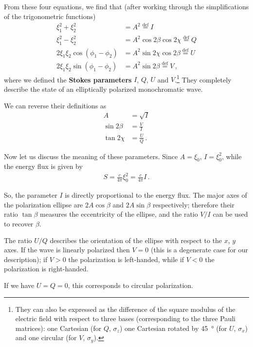 \documentclass[main.tex]{subfiles}
\begin{document}
From these four equations, we find that (after working through the simplifications of the trigonometric functions)
%
\begin{align}
\xi_1^2 + \xi_2^2 &= A^2 \overset{\text{def}}{=} I \\
\xi_1^2 - \xi_2^2 &= A^2 \cos 2 \beta \cos 2 \chi  \overset{\text{def}}{=} Q \\
2 \xi_1 \xi_2 \cos(\phi_1 - \phi_2 ) &= A^2 \sin 2 \chi \cos 2 \beta \overset{\text{def}}{=} U \\
2 \xi_1 \xi_2 \sin(\phi_1 - \phi_2 ) &= A^2 \sin 2 \beta \overset{\text{def}}{=} V
\,,
\end{align}
%
where we defined the \textbf{Stokes parameters} \(I\), \(Q\), \(U\) and \(V\).\footnote{They can also be expressed as the difference of the square modulus of the electric field with respect to three bases (corresponding to the three Pauli matrices): one Cartesian (for \(Q\), \(\sigma _z\)) one Cartesian rotated by \SI{45}{\degree} (for \(U\), \(\sigma _x\)) and one circular (for \(V\), \(\sigma _y\)).} They completely describe the state of an elliptically polarized monochromatic wave. 

We can reverse their definitions as 
%
\begin{align}
A &= \sqrt{I}  \\
\sin 2 \beta &= \frac{V}{I} \\
\tan 2 \chi &= \frac{U}{Q}
\,.
\end{align}

Now let us discuss the meaning of these parameters. Since \(A = \xi_0 \), \(I = \xi_0^2\), while the energy flux is given by 
%
\begin{align}
S = \frac{c}{4 \pi } \xi_0^2 = \frac{c}{4 \pi } I
\,.
\end{align}

So, the parameter \(I\) is directly proportional to the energy flux.
The major axes of the polarization ellipse are \(2A \cos \beta \) and \(2 A \sin \beta \) respectively; therefore their ratio \(\tan \beta \) measures the eccentricity of the ellipse, and the ratio \(V/I\) can be used to recover \(\beta \).

The ratio \(U/Q\) describes the orientation  of the ellipse with respect to the \(x\), \(y\) axes.
If the wave is linearly polarized then  \(V =0 \) (this is a degenerate case for our description); if \(V > 0\) the polarization  is left-handed, while if \(V< 0\) the polarization is right-handed.

If we have \(U = Q = 0\), this corresponds to circular polarization. 
\end{document}
